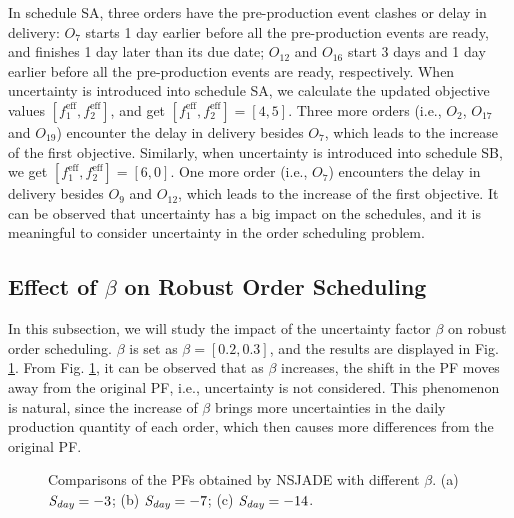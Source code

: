\documentclass[journal]{IEEEtran}
\theoremstyle{definition}
\begin{document}
In schedule SA, three orders have the pre-production event clashes or delay in delivery: $O_7$ starts 1 day earlier before all the pre-production events are ready, and finishes 1 day later than its due date; $O_{12}$ and $O_{16}$ start 3 days and 1 day earlier before all the pre-production events are ready, respectively.
When uncertainty is introduced into schedule SA, we calculate the updated objective values $[f_1^{\textrm{eff}}, f_2^{\textrm{eff}}]$, and get $[f_1^{\textrm{eff}}, f_2^{\textrm{eff}}]=[4, 5]$. Three more orders (i.e., $O_2$, $O_{17}$ and $O_{19}$) encounter the delay in delivery besides $O_7$, which leads to the increase of the first objective.
Similarly, when uncertainty is introduced into schedule SB, we get $[f_1^{\textrm{eff}}, f_2^{\textrm{eff}}]=[6, 0]$. One more order (i.e., $O_{7}$) encounters the delay in delivery besides $O_9$ and $O_{12}$, which leads to the increase of the first objective.
It can be observed that uncertainty has a big impact on the schedules, and it is meaningful to consider uncertainty in the order scheduling problem.

\subsection{Effect of $\beta$ on Robust Order Scheduling}
In this subsection, we will study the impact of the uncertainty factor $\beta$ on robust order scheduling. $\beta$ is set as $\beta=[0.2, 0.3]$, and the results are displayed in Fig. \ref{figbeta}. From Fig. \ref{figbeta}, it can be observed that as $\beta$ increases, the shift in the PF moves away from the original PF, i.e., uncertainty is not considered. This phenomenon is natural, since the increase of $\beta$ brings more uncertainties in the daily production quantity of each order, which then causes more differences from the original PF.
\begin{figure}
\centering
{}
\caption{Comparisons of the PFs obtained by NSJADE with different $\beta$. (a) $\emph{S}_\emph{day}=-3$; (b) $\emph{S}_\emph{day}=-7$; (c) $\emph{S}_\emph{day}=-14$.} \label{figbeta}
\end{figure}
\end{document}
